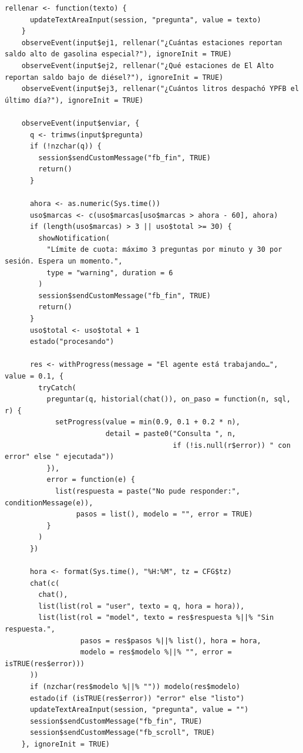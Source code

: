 \begin{lstlisting}[style=anexoR]
    rellenar <- function(texto) {
      updateTextAreaInput(session, "pregunta", value = texto)
    }
    observeEvent(input$ej1, rellenar("¿Cuántas estaciones reportan saldo alto de gasolina especial?"), ignoreInit = TRUE)
    observeEvent(input$ej2, rellenar("¿Qué estaciones de El Alto reportan saldo bajo de diésel?"), ignoreInit = TRUE)
    observeEvent(input$ej3, rellenar("¿Cuántos litros despachó YPFB el último día?"), ignoreInit = TRUE)

    observeEvent(input$enviar, {
      q <- trimws(input$pregunta)
      if (!nzchar(q)) {
        session$sendCustomMessage("fb_fin", TRUE)
        return()
      }

      ahora <- as.numeric(Sys.time())
      uso$marcas <- c(uso$marcas[uso$marcas > ahora - 60], ahora)
      if (length(uso$marcas) > 3 || uso$total >= 30) {
        showNotification(
          "Límite de cuota: máximo 3 preguntas por minuto y 30 por sesión. Espera un momento.",
          type = "warning", duration = 6
        )
        session$sendCustomMessage("fb_fin", TRUE)
        return()
      }
      uso$total <- uso$total + 1
      estado("procesando")

      res <- withProgress(message = "El agente está trabajando…", value = 0.1, {
        tryCatch(
          preguntar(q, historial(chat()), on_paso = function(n, sql, r) {
            setProgress(value = min(0.9, 0.1 + 0.2 * n),
                        detail = paste0("Consulta ", n,
                                        if (!is.null(r$error)) " con error" else " ejecutada"))
          }),
          error = function(e) {
            list(respuesta = paste("No pude responder:", conditionMessage(e)),
                 pasos = list(), modelo = "", error = TRUE)
          }
        )
      })

      hora <- format(Sys.time(), "%H:%M", tz = CFG$tz)
      chat(c(
        chat(),
        list(list(rol = "user", texto = q, hora = hora)),
        list(list(rol = "model", texto = res$respuesta %||% "Sin respuesta.",
                  pasos = res$pasos %||% list(), hora = hora,
                  modelo = res$modelo %||% "", error = isTRUE(res$error)))
      ))
      if (nzchar(res$modelo %||% "")) modelo(res$modelo)
      estado(if (isTRUE(res$error)) "error" else "listo")
      updateTextAreaInput(session, "pregunta", value = "")
      session$sendCustomMessage("fb_fin", TRUE)
      session$sendCustomMessage("fb_scroll", TRUE)
    }, ignoreInit = TRUE)


\end{lstlisting}
